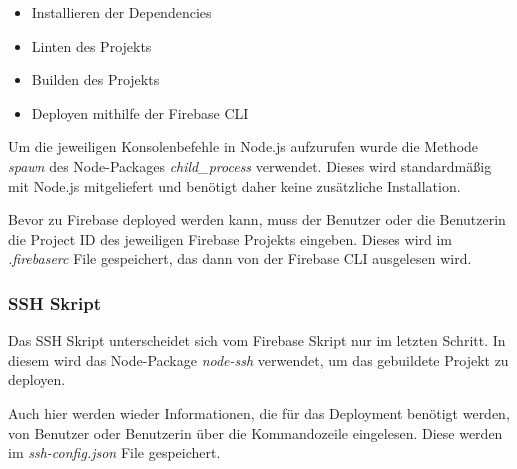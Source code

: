 \begin{itemize}
  \item Installieren der Dependencies
  \item Linten des Projekts
  \item Builden des Projekts
  \item Deployen mithilfe der Firebase CLI
\end{itemize}

Um die jeweiligen Konsolenbefehle in Node.js aufzurufen wurde die Methode \textit{spawn} des Node-Packages
\textit{child_process} verwendet.
Dieses wird standardmäßig mit Node.js mitgeliefert und benötigt daher keine zusätzliche Installation.

Bevor zu Firebase deployed werden kann, muss der Benutzer oder die Benutzerin die Project ID des jeweiligen
Firebase Projekts eingeben.
Dieses wird im \textit{.firebaserc} File gespeichert, das dann von der Firebase CLI ausgelesen wird.


\subsubsection{SSH Skript}
Das SSH Skript unterscheidet sich vom Firebase Skript nur im letzten Schritt.
In diesem wird das Node-Package \textit{node-ssh} verwendet, um das gebuildete Projekt zu deployen.

Auch hier werden wieder Informationen, die für das Deployment benötigt werden, von Benutzer oder Benutzerin über
die Kommandozeile eingelesen.
Diese werden im \textit{ssh-config.json} File gespeichert.
